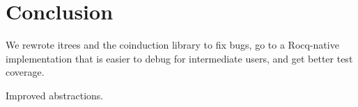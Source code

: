 \section{Conclusion}
\label{sec:conclusion}

We rewrote itrees and the coinduction library to fix bugs, go to a Rocq-native
implementation that is easier to debug for intermediate users, and get better
test coverage.

Improved abstractions.

